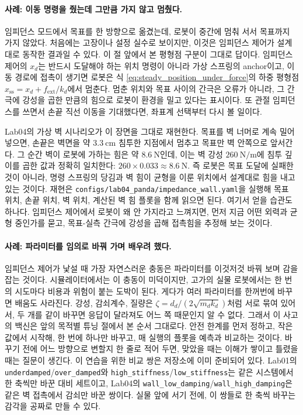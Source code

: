 \paragraph{사례: 이동 명령을 줬는데 그만큼 가지 않고 멈췄다.}
임피던스 모드에서 목표를 한 방향으로 옮겼는데, 로봇이 중간에 멈춰 서서 목표까지 가지 않았다.
처음에는 고장이나 설정 실수로 보이지만, 이것은 임피던스 제어가 설계대로 동작한 결과일 수 있다.
%
이 절 앞에서 본 평형점 구분이 그대로 답이다.
임피던스 제어의 $x_d$는 반드시 도달해야 하는 위치 명령이 아니라 가상 스프링의 anchor이고, 이동 경로에 접촉이 생기면 로봇은 식 \eqref{eq:steady_position_under_force}의 하중 평형점 $x_{\mathrm{ss}}=x_d+f_{\mathrm{ext}}/k_d$에서 멈춘다.
멈춘 위치와 목표 사이의 간극은 오류가 아니라, 그 간극에 강성을 곱한 만큼의 힘으로 로봇이 환경을 밀고 있다는 표시이다.
또 관절 임피던스를 쓰면서 손끝 직선 이동을 기대했다면, 좌표계 선택부터 다시 볼 일이다.

Lab04의 가상 벽 시나리오가 이 장면을 그대로 재현한다.
목표를 벽 너머로 계속 밀어 넣으면, 손끝은 벽면을 약 $3.3~\mathrm{cm}$ 침투한 지점에서 멈추고 목표만 벽 안쪽으로 앞서간다.
그 순간 벽이 로봇에 가하는 힘은 약 $8.6~\mathrm{N}$인데, 이는 벽 강성 $260~\mathrm{N/m}$에 침투 깊이를 곱한 값과 정확히 일치한다: $260\times0.033\approx8.6~\mathrm{N}$.
즉 로봇은 목표 도달에 실패한 것이 아니라, 명령 스프링의 당김과 벽 힘이 균형을 이룬 위치에서 설계대로 힘을 내고 있는 것이다.
%
재현은 \texttt{configs/lab04\_panda/impedance\_wall.yaml}을 실행해 목표 위치, 손끝 위치, 벽 위치, 계산된 벽 힘 플롯을 함께 읽으면 된다.
%
여기서 얻을 습관도 하나다.
임피던스 제어에서 로봇이 왜 안 가지라고 느껴지면, 먼저 지금 어떤 외력과 균형 중인가를 묻고, 목표-실측 간극에 강성을 곱해 접촉힘을 추정해 보는 것이다.

\paragraph{사례: 파라미터를 임의로 바꿔 가며 배우려 했다.}
임피던스 제어가 낯설 때 가장 자연스러운 충동은 파라미터를 이것저것 바꿔 보며 감을 잡는 것이다.
시뮬레이터에서는 이 충동이 미덕이지만, 고가의 실물 로봇에서는 한 번의 시도마다 비용과 위험이 붙는 도박이 된다.
%
게다가 여러 파라미터를 한꺼번에 바꾸면 배움도 사라진다.
강성, 감쇠계수, 질량은 \(\zeta=d_d/(2\sqrt{m_dk_d})\)처럼 서로 묶여 있어서, 두 개를 같이 바꾸면 응답이 달라져도 어느 쪽 때문인지 알 수 없다.
그래서 이 사고의 백신은 앞의 목적별 튜닝 절에서 본 순서 그대로다.
안전 한계를 먼저 정하고, 작은 값에서 시작해, 한 번에 하나만 바꾸고, 매 실행의 플롯을 예측과 비교하는 것이다.
바꾸기 전에 어느 방향으로 변할지 한 줄로 적어 두면, 맞았을 때는 이해가 쌓이고 틀렸을 때는 질문이 생긴다.
%
이 연습을 위한 비교 쌍은 저장소에 이미 준비되어 있다.
Lab01의 \texttt{underdamped}/\texttt{over\_damped}와 \texttt{high\_stiffness}/\texttt{low\_stiffness}는 같은 시스템에서 한 축씩만 바꾼 대비 세트이고, Lab04의 \texttt{wall\_low\_damping}/\texttt{wall\_high\_damping}은 같은 벽 접촉에서 감쇠만 바꾼 쌍이다.
실물 앞에 서기 전에, 이 쌍들로 한 축씩 바꾸는 감각을 공짜로 만들 수 있다.
%

